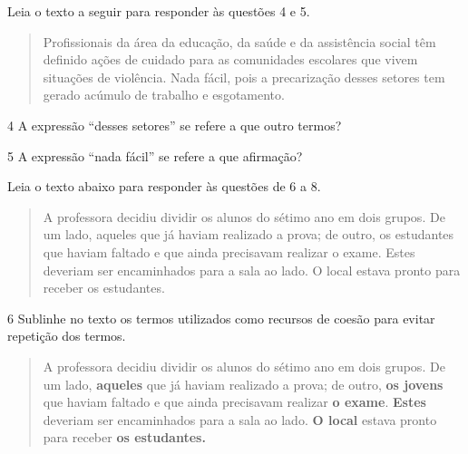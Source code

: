 Leia o texto a seguir para responder às questões 4 e 5.

\begin{quote}

Profissionais da área da educação, da saúde e da assistência social têm
definido ações de cuidado para as comunidades escolares que vivem
situações de violência. Nada fácil, pois a precarização desses setores
tem gerado acúmulo de trabalho e esgotamento.

\end{quote}


\num{4} A expressão ``desses setores'' se refere a que outro termos?


\num{5} A expressão ``nada fácil'' se refere a que afirmação?


Leia o texto abaixo para responder às questões de 6 a 8.

\begin{quote}

A professora decidiu dividir os alunos do sétimo ano em dois grupos. De um
lado, aqueles que já haviam realizado a prova; de outro, os estudantes que
haviam faltado e que ainda precisavam realizar o exame. Estes deveriam
ser encaminhados para a sala ao lado. O local estava pronto para receber
os estudantes.

\end{quote}

\num{6} Sublinhe no texto os termos utilizados como recursos de coesão para
evitar repetição dos termos. 

\begin{quote}
A professora decidiu dividir os alunos do sétimo ano em dois grupos. De um
lado, \textbf{aqueles} que já haviam realizado a prova; de outro, \textbf{os
jovens} que haviam faltado e que ainda precisavam realizar \textbf{o
exame}. \textbf{Estes} deveriam ser encaminhados para a sala ao lado.
\textbf{O local} estava pronto para receber \textbf{os estudantes.}
\end{quote}


